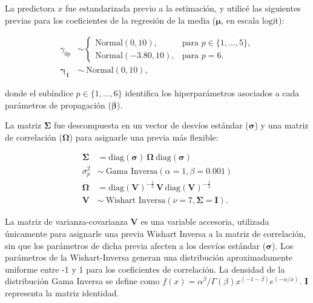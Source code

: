 La predictora $x$ fue estandarizada previo a la estimación, y utilicé las siguientes previas para los coeficientes de la regresión de la media ($\boldsymbol{\mu}$, en escala logit):

\begin{equation}
\begin{aligned}
    \gamma_{0p} &\sim 
    \begin{cases} 
        \text{Normal}(0, 10), & \text{para } p \in \{1, \ldots, 5\}, \\
        \text{Normal}(-3.80, 10), & \text{para } p = 6.
    \end{cases} \\
    \boldsymbol{\gamma_{1}} &\sim \ \text{Normal}(0, 10),
\end{aligned}
\end{equation}

\noindent donde el subíndice $p \in \{1, ..., 6\}$ identifica los hiperparámetros asociados a cada parámetros de propagación ($\boldsymbol{\beta}$).
 
La matriz $\boldsymbol{\Sigma}$ fue descompuesta en un vector de desvíos estándar ($\boldsymbol{\sigma}$) y una matriz de correlación ($\boldsymbol{\Omega}$) para asignarle una previa más flexible: 

\begin{equation}
\label{eq:hier2}
\begin{aligned}
    \boldsymbol{\Sigma} &= \text{diag}(\boldsymbol{\sigma}) \ \boldsymbol{\Omega} \ \text{diag}(\boldsymbol{\sigma}) \\
    \sigma_p^2 &\sim \ \text{Gama Inversa}(\alpha = 1, \beta = 0.001) \\
    \boldsymbol{\Omega} &= \text{diag}(\boldsymbol{V})^{-\frac{1}{2}} \, \boldsymbol{V} \, \text{diag}(\boldsymbol{V})^{-\frac{1}{2}}  \\
    \boldsymbol{V} &\sim \ \text{Wishart Inversa}(\nu = 7, \boldsymbol{\Sigma} = \boldsymbol{I}).    
\end{aligned}
\end{equation}

\noindent La matriz de varianza-covarianza $\boldsymbol{V}$ es una variable accesoria, utilizada únicamente para asignarle una previa Wishart Inversa a la matriz de correlación, sin que los parámetros de dicha previa afecten a los desvíos estándar ($\boldsymbol{\sigma}$). Los parámetros de la Wishart-Inversa generan una distribución aproximadamente uniforme entre -1 y 1 para los coeficientes de correlación. La densidad de la distribución Gama Inversa se define como $f(x) = \alpha^\beta/\Gamma(\beta) x^{(-1-\beta)} e^{(-\alpha/x)}$. $\boldsymbol{I}$ representa la matriz identidad.

